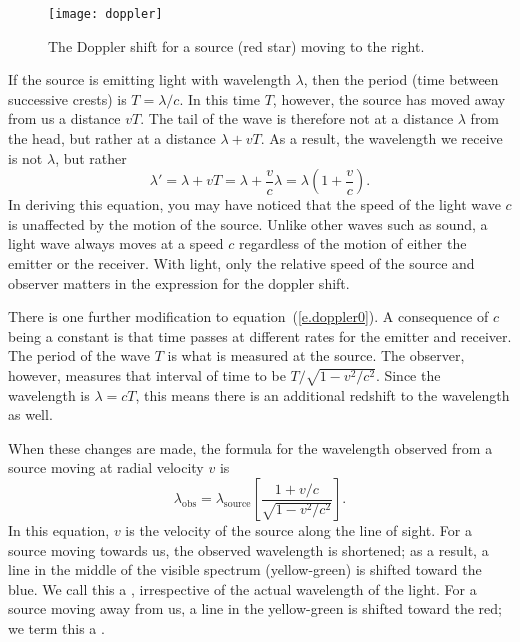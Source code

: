 \begin{figure*}
\centering\texttt{[image: doppler]}
\caption[Schematic of the doppler effect]{The Doppler shift for a source (red star) moving to the right.}
\label{f.doppler}
\end{figure*}

If the source is emitting light with wavelength $\lambda$, then the period (time between successive crests) is $T = \lambda/c$.  In this time $T$, however, the source has moved away from us a distance $vT$. The tail of the wave is therefore not at a distance $\lambda$ from the head, but rather at a distance $\lambda + vT$.  As a result, the wavelength we receive is not $\lambda$, but rather
\begin{equation}\label{e.doppler0}
 \lambda' = \lambda + vT = \lambda + \frac{v}{c}\lambda = \lambda\left(1+\frac{v}{c}\right).
\end{equation}
In deriving this equation, you may have noticed that the speed of the light wave $c$ is unaffected by the motion of the source.  Unlike other waves such as sound, a light wave always moves at a speed $c$ regardless of the motion of either the emitter or the receiver. With light, only the relative speed of the source and observer matters in the expression for the doppler shift.

There is one further modification to equation~(\ref{e.doppler0}).
A consequence of $c$ being a constant is that time passes at different rates for the emitter and receiver.  The period of the wave $T$ is what is measured at the source.  The observer, however, measures that interval of time to be $T/\sqrt{1-v^{2}/c^{2}}$.  Since the wavelength is $\lambda = cT$, this means there is an additional redshift to the wavelength as well.

When these changes are made, the formula for the wavelength observed from a source moving at radial velocity $v$ is
\begin{equation}\label{e.doppler}
\lambda_{\mathrm{obs}} 
 = \lambda_{\mathrm{source}} \left[\frac{1+v/c}{\sqrt{1-v^{2}/c^{2}}}\right].
\end{equation}
In this equation, $v$ is the velocity of the source along the line of sight.
For a source moving towards us, the observed wavelength is shortened; as a result, a line in the middle of the visible spectrum (yellow-green) is shifted toward the blue.  We call this a , irrespective of the actual wavelength of the light.  For a source moving away from us, a line in the yellow-green is shifted toward the red; we term this a .

